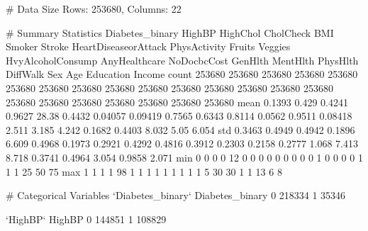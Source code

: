 \documentclass[11pt]{article}
\begin{document}
\begin{codeoutput}
# Data Size
Rows: 253680, Columns: 22

# Summary Statistics
       Diabetes_binary  HighBP  HighChol  CholCheck    BMI  Smoker  Stroke  HeartDiseaseorAttack  PhysActivity  Fruits  Veggies  HvyAlcoholConsump  AnyHealthcare  NoDocbcCost  GenHlth  MentHlth  PhysHlth  DiffWalk    Sex    Age  Education  Income
count           253680  253680    253680     253680 253680  253680  253680                253680        253680  253680   253680             253680         253680       253680   253680    253680    253680    253680 253680 253680     253680  253680
mean            0.1393   0.429    0.4241     0.9627  28.38  0.4432 0.04057               0.09419        0.7565  0.6343   0.8114             0.0562         0.9511      0.08418    2.511     3.185     4.242    0.1682 0.4403  8.032       5.05   6.054
std             0.3463  0.4949    0.4942     0.1896  6.609  0.4968  0.1973                0.2921        0.4292  0.4816   0.3912             0.2303         0.2158       0.2777    1.068     7.413     8.718    0.3741 0.4964  3.054     0.9858   2.071
min                  0       0         0          0     12       0       0                     0             0       0        0                  0              0            0        1         0         0         0      0      1          1       1
25%
50%
75%
max                  1       1         1          1     98       1       1                     1             1       1        1                  1              1            1        5        30        30         1      1     13          6       8

# Categorical Variables
`Diabetes_binary`
Diabetes_binary
0    218334
1     35346

`HighBP`
HighBP
0    144851
1    108829


\end{codeoutput}
\end{document}
